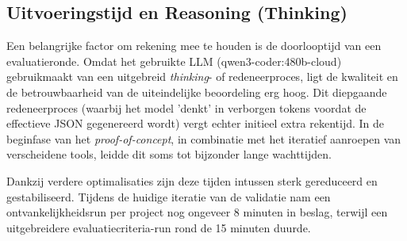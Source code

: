 \subsection{Uitvoeringstijd en Reasoning (Thinking)}
Een belangrijke factor om rekening mee te houden is de doorlooptijd van een evaluatieronde. Omdat het gebruikte LLM (qwen3-coder:480b-cloud) gebruikmaakt van een uitgebreid \textit{thinking}- of redeneerproces, ligt de kwaliteit en de betrouwbaarheid van de uiteindelijke beoordeling erg hoog. Dit diepgaande redeneerproces (waarbij het model 'denkt' in verborgen tokens voordat de effectieve JSON gegenereerd wordt) vergt echter initieel extra rekentijd. In de beginfase van het \textit{proof-of-concept}, in combinatie met het iteratief aanroepen van verscheidene tools, leidde dit soms tot bijzonder lange wachttijden. 

\vspace{1em}

Dankzij verdere optimalisaties zijn deze tijden intussen sterk gereduceerd en gestabiliseerd. Tijdens de huidige iteratie van de validatie nam een ontvankelijkheidsrun per project nog ongeveer 8 minuten in beslag, terwijl een uitgebreidere evaluatiecriteria-run rond de 15 minuten duurde.